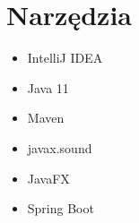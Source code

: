 \section{Narzędzia}

\begin{itemize}
    \item IntelliJ IDEA
    \item Java 11\
    \item Maven
    \item javax.sound
    \item JavaFX
    \item Spring Boot
\end{itemize}